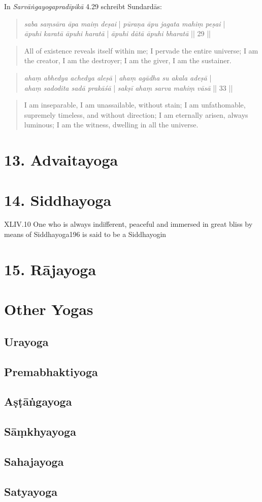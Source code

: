 In \textit{Sarvāṅgayogapradīpikā} 4.29 schreibt Sundardās:
\begin{quote}
\textit{saba saṃsāra āpa maiṃ deṣai} | \textit{pūraṇa āpu jagata mahiṃ peṣai} |\\
\textit{āpuhi karatā āpuhi haratā} | \textit{āpuhi dātā āpuhi bharatā} || 29 || 
\end{quote}
\begin{quote}
  All of existence reveals itself within me; I pervade the entire universe;
  I am the creator, I am the destroyer; I am the giver, I am the sustainer.
\end{quote}
\begin{quote}
\textit{ahaṃ abhedya achedya aleṣā} | \textit{ahaṃ agādha su akala adeṣā} | \\
\textit{ahaṃ sadodita sadā prakāśā} | \textit{sakṣī ahaṃ sarva mahiṃ vāsā} || 33 ||
\end{quote}
\begin{quote}
  I am inseparable, I am unassailable, without stain; I am unfathomable, supremely timeless, and without direction;
  I am eternally arisen, always luminous; I am the witness, dwelling in all the universe.
\end{quote}


\section{13. Advaitayoga}
\label{advaitayogaintro}
\section{14. Siddhayoga}
\label{siddhayogaintro}

XLIV.10 One who is always indifferent, peaceful and immersed in great bliss by
means of Siddhayoga196 is said to be a Siddhayogin

\section{15. Rājayoga}
\label{rajayogaintro}

\section{Other Yogas}

\subsection{Urayoga}
\subsection{Premabhaktiyoga}
\subsection{Aṣṭāṅgayoga}
\subsection{Sāṃkhyayoga}
\subsection{Sahajayoga}
\subsection{Satyayoga}






